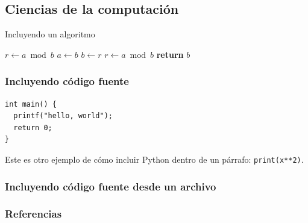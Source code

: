 \subsection{Ciencias de la computación}
\begin{frame}{Incluyendo un algoritmo}
\begin{algorithm}[H]
\renewcommand{\thealgorithm}{} %
\caption{de Euclides}
\label{alg:euclid}
\begin{algorithmic}[1] %
     
    \State $r\gets a \bmod b$
     
        \State $a \gets b$
        \State $b \gets r$
        \State $r \gets a \bmod b$
    \EndWhile\label{euclidendwhile}
    \State \textbf{return} $b$
    \EndProcedure
\end{algorithmic}
\end{algorithm}

\end{frame}

\begin{frame}[fragile] %
\frametitle{Incluyendo código fuente}
\begin{listing}
\begin{verbatim}
int main() {
  printf("hello, world");
  return 0;
}
\end{verbatim}
\caption{Un programa de ejemplo en C}\label{lst:hello}
\end{listing}

Este es otro ejemplo de cómo incluir Python dentro de un párrafo: \texttt{print(x**2)}.

\end{frame}

\begin{frame}[fragile] %
\frametitle{Incluyendo código fuente desde un archivo}
\end{frame}

\nocite{Ross2012}
\begin{frame}[allowframebreaks]
\frametitle{Referencias}
\printbibliography
\end{frame}
